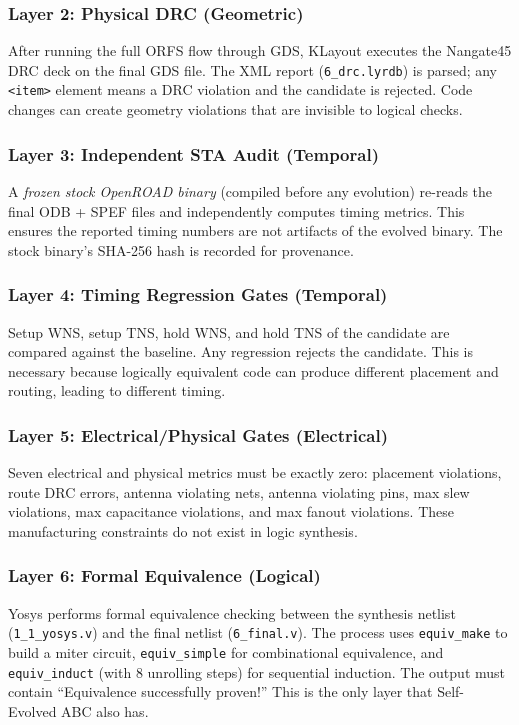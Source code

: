 \documentclass[conference]{IEEEtran}
\begin{document}
\subsubsection{Layer 2: Physical DRC (Geometric)}
After running the full ORFS flow through GDS, KLayout executes the Nangate45 DRC deck on the final GDS file. The XML report (\texttt{6\_drc.lyrdb}) is parsed; any \texttt{<item>} element means a DRC violation and the candidate is rejected. Code changes can create geometry violations that are invisible to logical checks.

\subsubsection{Layer 3: Independent STA Audit (Temporal)}
A \textit{frozen stock OpenROAD binary} (compiled before any evolution) re-reads the final ODB + SPEF files and independently computes timing metrics. This ensures the reported timing numbers are not artifacts of the evolved binary. The stock binary's SHA-256 hash is recorded for provenance.

\subsubsection{Layer 4: Timing Regression Gates (Temporal)}
Setup WNS, setup TNS, hold WNS, and hold TNS of the candidate are compared against the baseline. Any regression rejects the candidate. This is necessary because logically equivalent code can produce different placement and routing, leading to different timing.

\subsubsection{Layer 5: Electrical/Physical Gates (Electrical)}
Seven electrical and physical metrics must be exactly zero: placement violations, route DRC errors, antenna violating nets, antenna violating pins, max slew violations, max capacitance violations, and max fanout violations. These manufacturing constraints do not exist in logic synthesis.

\subsubsection{Layer 6: Formal Equivalence (Logical)}
Yosys performs formal equivalence checking between the synthesis netlist (\texttt{1\_1\_yosys.v}) and the final netlist (\texttt{6\_final.v}). The process uses \texttt{equiv\_make} to build a miter circuit, \texttt{equiv\_simple} for combinational equivalence, and \texttt{equiv\_induct} (with 8 unrolling steps) for sequential induction. The output must contain ``Equivalence successfully proven!'' This is the only layer that Self-Evolved ABC also has.
\end{document}
